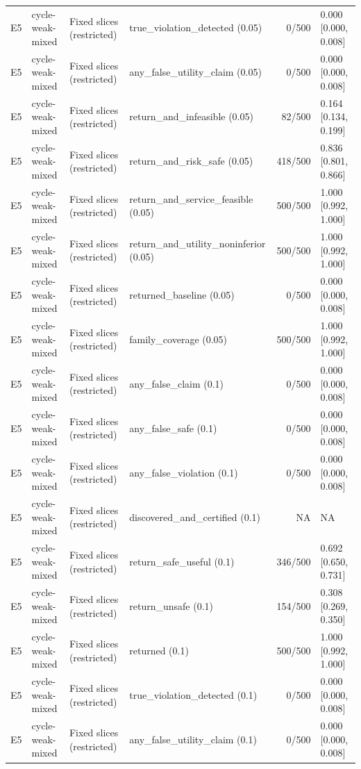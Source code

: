 \begin{longtable}{p{.04\linewidth}p{.18\linewidth}p{.19\linewidth}p{.16\linewidth}r p{.21\linewidth}}
E5 & cycle-weak-mixed & Fixed slices (restricted) & true\_violation\_detected (0.05) & 0/500 & 0.000 [0.000, 0.008]\\
E5 & cycle-weak-mixed & Fixed slices (restricted) & any\_false\_utility\_claim (0.05) & 0/500 & 0.000 [0.000, 0.008]\\
E5 & cycle-weak-mixed & Fixed slices (restricted) & return\_and\_infeasible (0.05) & 82/500 & 0.164 [0.134, 0.199]\\
E5 & cycle-weak-mixed & Fixed slices (restricted) & return\_and\_risk\_safe (0.05) & 418/500 & 0.836 [0.801, 0.866]\\
E5 & cycle-weak-mixed & Fixed slices (restricted) & return\_and\_service\_feasible (0.05) & 500/500 & 1.000 [0.992, 1.000]\\
E5 & cycle-weak-mixed & Fixed slices (restricted) & return\_and\_utility\_noninferior (0.05) & 500/500 & 1.000 [0.992, 1.000]\\
E5 & cycle-weak-mixed & Fixed slices (restricted) & returned\_baseline (0.05) & 0/500 & 0.000 [0.000, 0.008]\\
E5 & cycle-weak-mixed & Fixed slices (restricted) & family\_coverage (0.05) & 500/500 & 1.000 [0.992, 1.000]\\
E5 & cycle-weak-mixed & Fixed slices (restricted) & any\_false\_claim (0.1) & 0/500 & 0.000 [0.000, 0.008]\\
E5 & cycle-weak-mixed & Fixed slices (restricted) & any\_false\_safe (0.1) & 0/500 & 0.000 [0.000, 0.008]\\
E5 & cycle-weak-mixed & Fixed slices (restricted) & any\_false\_violation (0.1) & 0/500 & 0.000 [0.000, 0.008]\\
E5 & cycle-weak-mixed & Fixed slices (restricted) & discovered\_and\_certified (0.1) & NA & NA\\
E5 & cycle-weak-mixed & Fixed slices (restricted) & return\_safe\_useful (0.1) & 346/500 & 0.692 [0.650, 0.731]\\
E5 & cycle-weak-mixed & Fixed slices (restricted) & return\_unsafe (0.1) & 154/500 & 0.308 [0.269, 0.350]\\
E5 & cycle-weak-mixed & Fixed slices (restricted) & returned (0.1) & 500/500 & 1.000 [0.992, 1.000]\\
E5 & cycle-weak-mixed & Fixed slices (restricted) & true\_violation\_detected (0.1) & 0/500 & 0.000 [0.000, 0.008]\\
E5 & cycle-weak-mixed & Fixed slices (restricted) & any\_false\_utility\_claim (0.1) & 0/500 & 0.000 [0.000, 0.008]\\

\end{longtable}
